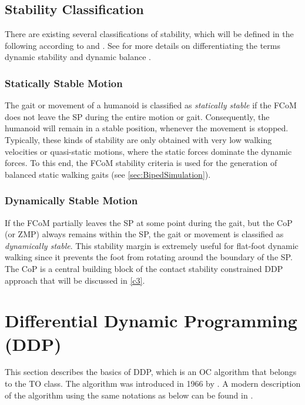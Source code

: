 \subsection{Stability Classification}
There are existing several classifications of stability, which will be defined in the following according to \cite[Sec.1.2.1]{westervelt2018feedback} and \cite{garcia2002classification}. See \citeauthor{vukobratovic2007towards} for more details on differentiating the terms dynamic stability and dynamic balance \cite{vukobratovic2007towards}.  
\subsubsection{Statically Stable Motion}
The gait or movement of a humanoid is classified as \textit{statically stable} if the \gls{FCoM} does not leave the \gls{SP} during the entire motion or gait. Consequently, the humanoid will remain in a stable position, whenever the movement is stopped. Typically, these kinds of stability are only obtained with very low walking velocities or quasi-static motions, where the static forces dominate the dynamic forces. To this end, the \gls{FCoM} stability criteria is used for the generation of balanced static walking gaits (see \cref{sec:BipedSimulation}).   
\subsubsection{Dynamically Stable Motion}
If the \gls{FCoM} partially leaves the \gls{SP} at some point during the gait, but the \gls{CoP} (or \gls{ZMP}) always remains within the \gls{SP}, the gait or movement is classified as \textit{dynamically stable}. This stability margin is extremely useful for flat-foot dynamic walking since it prevents the foot from rotating around the boundary of the \gls{SP}. The \gls{CoP} is a central building block of the contact stability constrained \gls{DDP} approach that will be discussed in \cref{c3}.   


\section{Differential Dynamic Programming (DDP)}\label{sec:TheoryDDP}
This section describes the basics of \gls{DDP}, which is an \gls{OC} algorithm that belongs to the \gls{TO} class. The algorithm was introduced in 1966 by \citeauthor{mayne1966} \citep{mayne1966}. A modern description of the algorithm using the same notations as below can be found in \cite{tassa2012synthesis, tassa2014control}.
